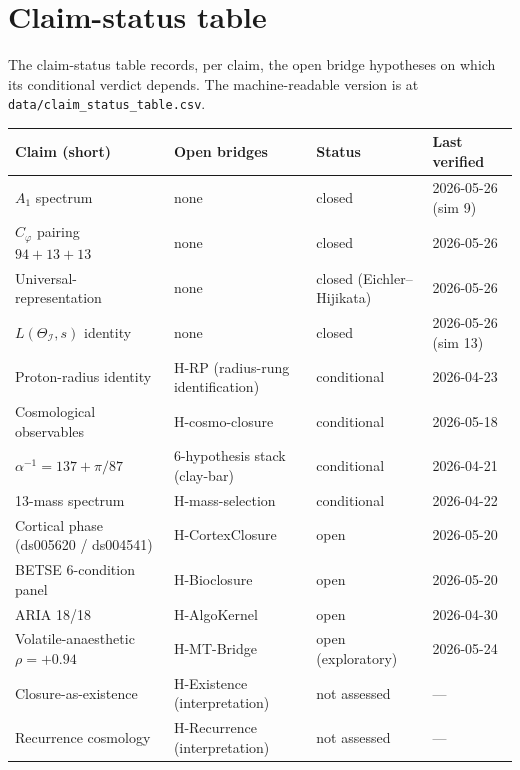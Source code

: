 \documentclass[11pt,a4paper]{article}
\newcommand{\II}{\mathcal{I}}
\newcommand{\Cphi}{C_\varphi}
\begin{document}
\section{Claim-status table}
\label{app:status}

The claim-status table records, per claim, the open bridge
hypotheses on which its conditional verdict depends. The
machine-readable version is at \texttt{data/claim\_status\_table.csv}.

\begin{small}
\begin{longtable}{p{4.2cm}p{3.6cm}p{3.4cm}p{2.5cm}}
\toprule
\textbf{Claim (short)} & \textbf{Open bridges} & \textbf{Status} & \textbf{Last verified} \\
\midrule
\endhead
$A_1$ spectrum & none & closed & 2026-05-26 (sim 9) \\
$\Cphi$ pairing $94+13+13$ & none & closed & 2026-05-26 \\
Universal-representation & none & closed (Eichler--Hijikata) & 2026-05-26 \\
$L(\Theta_\II,s)$ identity & none & closed & 2026-05-26 (sim 13) \\
Proton-radius identity & H-RP (radius-rung identification)
                       & conditional & 2026-04-23 \\
Cosmological observables & H-cosmo-closure & conditional & 2026-05-18 \\
$\alpha^{-1} = 137+\pi/87$ & 6-hypothesis stack (clay-bar) & conditional & 2026-04-21 \\
13-mass spectrum & H-mass-selection & conditional & 2026-04-22 \\
Cortical phase (ds005620 / ds004541) & H-CortexClosure & open & 2026-05-20 \\
BETSE 6-condition panel & H-Bioclosure & open & 2026-05-20 \\
ARIA 18/18 & H-AlgoKernel & open & 2026-04-30 \\
Volatile-anaesthetic $\rho=+0.94$ & H-MT-Bridge & open (exploratory)
                                  & 2026-05-24 \\
Closure-as-existence & H-Existence (interpretation) & not assessed
                                  & --- \\
Recurrence cosmology & H-Recurrence (interpretation) & not assessed
                                  & --- \\
\bottomrule
\end{longtable}
\end{small}
\end{document}
